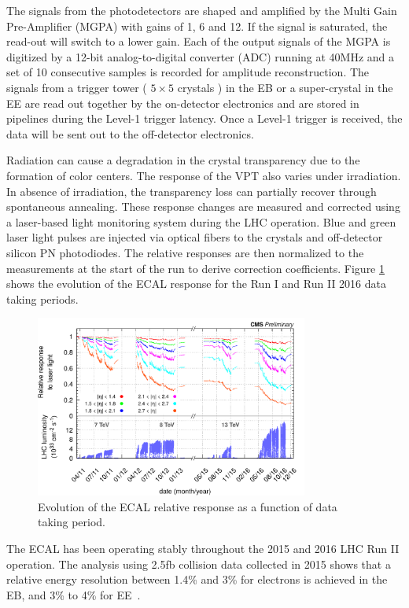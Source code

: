 \documentclass[thesis.tex]{subfiles}
\begin{document}
The signals from the photodetectors are shaped and amplified by the Multi Gain Pre-Amplifier (MGPA) with gains of 1, 6 and 12. 
If the signal is saturated, the read-out will switch to a lower gain. 
Each of the output signals of the MGPA is digitized by a 12-bit analog-to-digital converter (ADC) running at 40MHz and a set of 10 consecutive samples is recorded for amplitude reconstruction.
The signals from a trigger tower ( $5\times5$ crystals ) in the EB or a super-crystal in the EE are read out together by the on-detector electronics and are stored in pipelines during the Level-1 trigger latency. 
Once a Level-1 trigger is received, the data will be sent out to the off-detector electronics. 

Radiation can cause a degradation in the crystal transparency due to the formation of color centers. 
The response of the VPT also varies under irradiation. 
In absence of irradiation, the transparency loss can partially recover through spontaneous annealing. 
These response changes are measured and corrected using a laser-based light monitoring system during the LHC operation. 
Blue and green laser light pulses are injected via optical fibers to the crystals and off-detector silicon PN photodiodes. 
The relative responses are then normalized to the measurements at the start of the run to derive correction coefficients. 
Figure \ref{fig:lasermonitor} shows the evolution of the ECAL response for the Run I and Run II 2016 data taking periods. 

\begin{figure}[hbt]
	\centering
	\includegraphics[width=0.8\textwidth]{Fig/lasermonitor.png}
	\caption{Evolution of the ECAL relative response as a function of data taking period.} 
	\label{fig:lasermonitor}
\end{figure}

The ECAL has been operating stably throughout the 2015 and 2016 LHC Run II operation.
The analysis using 2.5fb collision data collected in 2015 shows that a relative energy resolution
between 1.4\% and 3\% for electrons is achieved in the EB, and 3\% to 4\% for EE~\cite{Sun:2233637}. 
\end{document}
